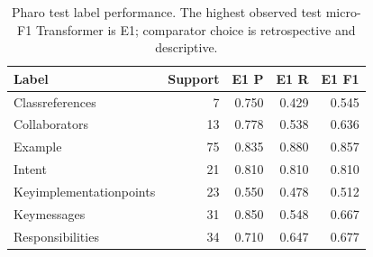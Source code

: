 \begin{table}[htbp]
\centering\small
\caption{Pharo test label performance. The highest observed test micro-F1 Transformer is E1; comparator choice is retrospective and descriptive.}\label{tab:pharolabels}
\begin{tabular}{lrrrr}\toprule
Label & Support & E1 P & E1 R & E1 F1\\\midrule
Classreferences & 7 & 0.750 & 0.429 & 0.545\\
Collaborators & 13 & 0.778 & 0.538 & 0.636\\
Example & 75 & 0.835 & 0.880 & 0.857\\
Intent & 21 & 0.810 & 0.810 & 0.810\\
Keyimplementationpoints & 23 & 0.550 & 0.478 & 0.512\\
Keymessages & 31 & 0.850 & 0.548 & 0.667\\
Responsibilities & 34 & 0.710 & 0.647 & 0.677\\
\bottomrule\end{tabular}
\end{table}
